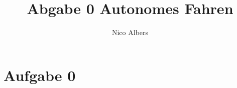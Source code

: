 \documentclass[12pt,final]{article}
\author{Nico Albers}
\title{Abgabe 0 Autonomes Fahren}
\begin{document}
\maketitle

\section{Aufgabe 0}




\end{document}

